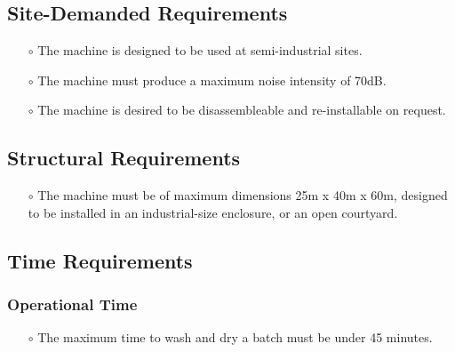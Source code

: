 \subsection{Site-Demanded Requirements}
\begin{itemize}
    \item[$\scriptstyle\circ$] The machine is designed to be used at semi-industrial sites. 
    \item[$\scriptstyle\circ$] The machine must produce a maximum noise intensity of 70dB. 
    \item[$\scriptstyle\circ$] The machine is desired to be disassembleable and re-installable on request. 
\end{itemize}
\subsection{Structural Requirements}
\begin{itemize}
    \item[$\scriptstyle\circ$] The machine must be of maximum dimensions 25m x 40m x 60m, designed to be installed in an industrial-size enclosure, or an open courtyard. 
\end{itemize}
\subsection{Time Requirements}
\subsubsection{Operational Time}
    \begin{itemize}
        \item[$\scriptstyle\circ$] The maximum time to wash and dry a batch must be under 45 minutes. 
    \end{itemize}
